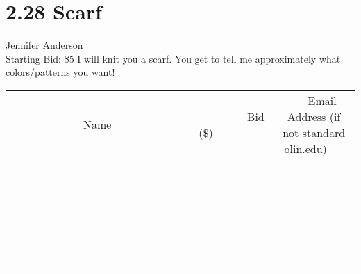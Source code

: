 \documentclass[11pt]{article}
\begin{document}
\section*{2.28 Scarf}
Jennifer Anderson
\\
Starting Bid: \$5
\newline
I will knit you a scarf. You get to tell me approximately what colors/patterns you want!
\\[6ex]
\begin{tabular}{c c c}
~~~~~~~~~~~~~Name~~~~~~~~~~~~~ & ~~~~~~~~~Bid (\$)~~~~~~~~~  & ~~~Email Address (if not standard olin.edu)~~~\\
 & & \\
\hline
 & & \\
\hline
 & & \\
\hline
 & & \\
\hline
 & & \\
\hline
 & & \\
\hline
 & & \\
\hline
 & & \\
\hline
 & & \\
\hline
 & & \\
\hline
 & & \\
\hline
 & & \\
\hline
 & & \\
\hline
 & & \\
\hline
 & & \\
\hline
 & & \\
\hline
 & & \\
\hline
 & & \\
\hline
 & & \\
\hline
 & & \\
\hline
 & & \\
\hline
 & & \\
\hline
 & & \\
\hline
 & & \\
\hline
 & & \\
\hline
 & & \\
\hline
\end{tabular}
\newpage
\end{document}
